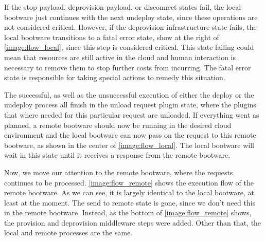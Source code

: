 If the stop payload, deprovision payload, or disconnect states fail, the local bootware just continues with the next undeploy state, since these operations are not considered critical.
However, if the deprovision infrastructure state fails, the local bootware transitions to a fatal error state, show at the right of \autoref{image:flow_local}, since this step is considered critical.
This state failing could mean that resources are still active in the cloud and human interaction is necessary to remove them to stop further costs from incurring.
The fatal error state is responsible for taking special actions to remedy this situation.

The successful, as well as the unsuccessful execution of either the deploy or the undeploy process all finish in the unload request plugin state, where the plugins that where needed for this particular request are unloaded.
If everything went as planned, a remote bootware should now be running in the desired cloud environment and the local bootware can now pass on the request to this remote bootware, as shown in the center of \autoref{image:flow_local}.
The local bootware will wait in this state until it receives a response from the remote bootware.

Now, we move our attention to the remote bootware, where the requests continues to be processed.
\autoref{image:flow_remote} shows the execution flow of the remote bootware.
As we can see, it is largely identical to the local bootware, at least at the moment.
The send to remote state is gone, since we don't need this in the remote bootware.
Instead, as the bottom of \autoref{image:flow_remote} shows, the provision and deprovision middleware steps were added.
Other than that, the local and remote processes are the same.

